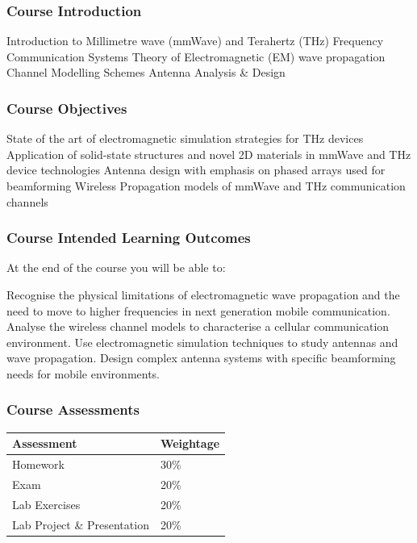 \documentclass[10pt, compress]{beamer}
\begin{document}
\begin{frame}[fragile]
  \frametitle{Course Introduction}
\begin{outline}
  \1 Introduction to Millimetre wave (mmWave) and Terahertz (THz) Frequency Communication Systems
  \1 Theory of Electromagnetic (EM) wave propagation
  \1 Channel Modelling Schemes
  \1 Antenna Analysis \& Design
\end{outline}
\end{frame}
\begin{frame}[fragile]
  \frametitle{Course Objectives}
\begin{outline}[itemize]
  \1 State of the art of electromagnetic simulation strategies for THz devices
  \1 Application of solid-state structures and novel 2D materials in mmWave and THz device technologies
  \1 Antenna design with emphasis on phased arrays used for beamforming
  \1 Wireless Propagation models of mmWave and THz communication channels
\end{outline}
\end{frame}
\begin{frame}[fragile]
  \frametitle{Course Intended Learning Outcomes}
      At the end of the course you will be able to:
      \begin{outline}[enumerate]
        \1 Recognise the physical limitations of electromagnetic wave propagation and the need to move to higher frequencies in next generation mobile communication.
        \1 Analyse the wireless channel models to characterise a cellular communication environment.
        \1 Use electromagnetic simulation techniques to study antennas and wave propagation.
        \1 Design complex antenna systems with specific beamforming needs for mobile environments.
        \end{outline}
\end{frame}
\begin{frame}[fragile]
  \frametitle{Course Assessments}
  \begin{table}
      \begin{tabular}{ll}
      \toprule
      Assessment & Weightage\\
      \midrule
      Homework & 30\% \\
      Exam & 20\% \\
      Lab Exercises & 20\% \\
      Lab Project \& Presentation & 20\% \\
      \bottomrule
    \end{tabular}
  \end{table}
\end{frame}
\end{document}
